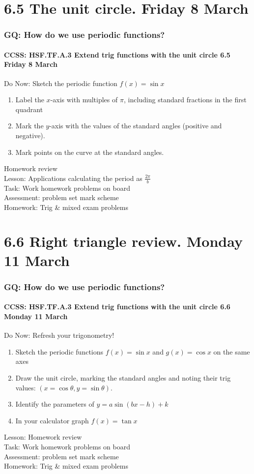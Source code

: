 \documentclass{beamer}
\begin{document}
\section{6.5 The unit circle. Friday 8 March}
  \frame
  {
    \frametitle{GQ: How do we use periodic functions?}
    \framesubtitle{CCSS: HSF.TF.A.3 Extend trig functions with the unit circle  \hfill \alert{6.5 Friday 8 March}}

    \begin{block}{Do Now: Sketch the periodic function $f(x)=\sin{x}$}
      \begin{enumerate}
      \item Label the $x$-axis with multiples of $\pi$, including standard fractions in the first quadrant
      \item Mark the $y$-axis with the values of the standard angles (positive and negative).
      \item Mark points on the curve at the standard angles.
      \end{enumerate}
   \end{block}
    Homework review\\[5pt]
    Lesson: Applications calculating the period as $\frac{2\pi}{b}$\\%
    Task: Work homework problems on board\\%
    Assessment: problem set mark scheme\\%
    Homework: Trig \& mixed exam problems
  }

\section{6.6 Right triangle review. Monday 11 March}
  \frame
  {
    \frametitle{GQ: How do we use periodic functions?}
    \framesubtitle{CCSS: HSF.TF.A.3 Extend trig functions with the unit circle  \hfill \alert{6.6 Monday 11 March}}

    \begin{block}{Do Now: Refresh your trigonometry!}
      \begin{enumerate}
      \item Sketch the periodic functions $f(x)=\sin{x}$ and $g(x)=\cos{x}$ on the same axes
      \item Draw the unit circle, marking the standard angles and noting their trig values: $(x=\cos{\theta}, y=\sin{\theta})$.
      \item Identify the parameters of $y=a\sin{(bx-h)}+k$
      \item In your calculator graph $f(x)=\tan{x}$
      \end{enumerate}
   \end{block}
    Lesson: Homework review\\[5pt]
    Task: Work homework problems on board\\%
    Assessment: problem set mark scheme\\%
    Homework: Trig \& mixed exam problems
  }
\end{document}
